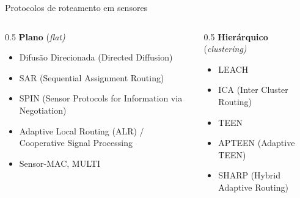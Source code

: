 \documentclass[aspectratio=169,11pt]{beamer}
\begin{document}
\begin{frame}{Protocolos de roteamento em sensores}
  \begin{columns}
    \begin{column}{0.5\textwidth}
      \textbf{Plano} (\emph{flat)}
      \begin{itemize}
        \item Difusão Direcionada (Directed Diffusion)
        \item SAR (Sequential Assignment Routing)
        \item SPIN (Sensor Protocols for Information via Negotiation)
        \item Adaptive Local Routing (ALR) / Cooperative Signal Processing
        \item Sensor-MAC, MULTI
      \end{itemize}
    \end{column}
    \begin{column}{0.5\textwidth}
      \textbf{Hierárquico} (\emph{clustering)}
      \begin{itemize}
        \item LEACH
        \item ICA (Inter Cluster Routing)
        \item TEEN
        \item APTEEN (Adaptive TEEN)
        \item SHARP (Hybrid Adaptive Routing)
      \end{itemize}
    \end{column}
  \end{columns}
\end{frame}
\end{document}
